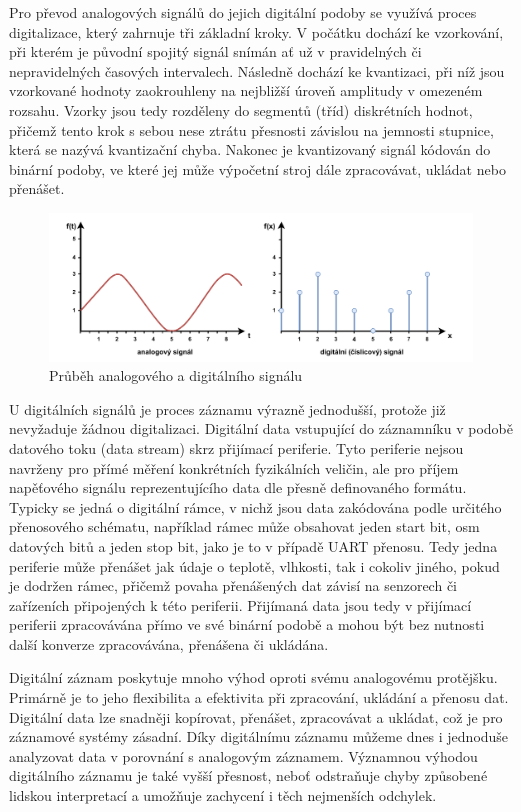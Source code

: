 Pro převod analogových signálů do jejich digitální podoby se využívá proces digitalizace, který zahrnuje tři základní kroky. V počátku dochází ke vzorkování, při kterém je původní spojitý signál snímán ať už v pravidelných či nepravidelných časových intervalech. Následně dochází ke kvantizaci, při níž jsou vzorkované hodnoty zaokrouhleny na nejbližší úroveň amplitudy v omezeném rozsahu. Vzorky jsou tedy rozděleny do segmentů (tříd) diskrétních hodnot, přičemž tento krok s sebou nese ztrátu přesnosti závislou na jemnosti stupnice, která se nazývá kvantizační chyba. Nakonec je kvantizovaný signál kódován do binární podoby, ve které jej může výpočetní stroj dále zpracovávat, ukládat nebo přenášet.

\begin{figure}[h]
    \centering
    \includegraphics[width=1.00\textwidth]{obrazky-figures/digital_vs_analog.pdf}
    \caption{Průběh analogového a digitálního signálu}
    \label{fig:digital-vs-analog}
\end{figure}

U digitálních signálů je proces záznamu výrazně jednodušší, protože již nevyžaduje žádnou digitalizaci. Digitální data vstupující do záznamníku v podobě datového toku (data stream) skrz přijímací periferie. Tyto periferie nejsou navrženy pro přímé měření konkrétních fyzikálních veličin, ale pro příjem napěťového signálu reprezentujícího data dle přesně definovaného formátu. Typicky se jedná o digitální rámce, v nichž jsou data zakódována podle určitého přenosového schématu, například rámec může obsahovat jeden start bit, osm datových bitů a jeden stop bit, jako je to v případě UART přenosu. Tedy jedna periferie může přenášet jak údaje o teplotě, vlhkosti, tak i cokoliv jiného, pokud je dodržen rámec, přičemž povaha přenášených dat závisí na senzorech či zařízeních připojených k této periferii. Přijímaná data jsou tedy v přijímací periferii zpracovávána přímo ve své binární podobě a mohou být bez nutnosti další konverze zpracovávána, přenášena či ukládána.

Digitální záznam poskytuje mnoho výhod oproti svému analogovému protějšku. Primárně je to jeho flexibilita a efektivita při zpracování, ukládání a přenosu dat. Digitální data lze snadněji kopírovat, přenášet, zpracovávat a ukládat, což je pro záznamové systémy zásadní. Díky digitálnímu záznamu můžeme dnes i jednoduše analyzovat data v porovnání s analogovým záznamem.  Významnou výhodou digitálního záznamu je také vyšší přesnost, neboť odstraňuje chyby způsobené lidskou interpretací a umožňuje zachycení i těch nejmenších odchylek. \cite{rcp_analog_vs_digital}


